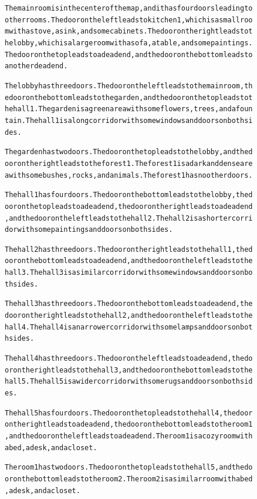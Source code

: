 \begin{figure}[h!]
\begin{AIbox}{\DV}
{\begin{alltt}
The main room is in the center of the map, and it has four doors leading to other rooms. The door on the left leads to kitchen 1, which is a small room with a stove, a sink, and some cabinets. The door on the right leads to the lobby, which is a large room with a sofa, a table, and some paintings. The door on the top leads to a dead end, and the door on the bottom leads to another dead end.

The lobby has three doors. The door on the left leads to the main room, the door on the bottom leads to the garden, and the door on the top leads to the hall 1. The garden is a green area with some flowers, trees, and a fountain. The hall 1 is a long corridor with some windows and doors on both sides.

The garden has two doors. The door on the top leads to the lobby, and the door on the right leads to the forest 1. The forest 1 is a dark and dense area with some bushes, rocks, and animals. The forest 1 has no other doors.

The hall 1 has four doors. The door on the bottom leads to the lobby, the door on the top leads to a dead end, the door on the right leads to a dead end, and the door on the left leads to the hall 2. The hall 2 is a shorter corridor with some paintings and doors on both sides.

The hall 2 has three doors. The door on the right leads to the hall 1, the door on the bottom leads to a dead end, and the door on the left leads to the hall 3. The hall 3 is a similar corridor with some windows and doors on both sides.

The hall 3 has three doors. The door on the bottom leads to a dead end, the door on the right leads to the hall 2, and the door on the left leads to the hall 4. The hall 4 is a narrower corridor with some lamps and doors on both sides.

The hall 4 has three doors. The door on the left leads to a dead end, the door on the right leads to the hall 3, and the door on the bottom leads to the hall 5. The hall 5 is a wider corridor with some rugs and doors on both sides.

The hall 5 has four doors. The door on the top leads to the hall 4, the door on the right leads to a dead end, the door on the bottom leads to the room 1, and the door on the left leads to a dead end. The room 1 is a cozy room with a bed, a desk, and a closet.

The room 1 has two doors. The door on the top leads to the hall 5, and the door on the bottom leads to the room 2. The room 2 is a similar room with a bed, a desk, and a closet.


\end{alltt}}
\end{AIbox}
\end{figure}
